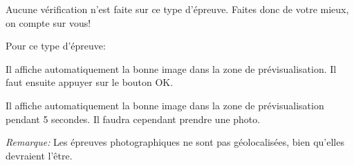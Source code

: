\documentclass[11pt]{scrreprt}
\begin{document}
    Aucune vérification n'est faite sur ce type d'épreuve. Faites donc de votre mieux, on compte sur vous!

    Pour ce type d'épreuve:
    \begin{description}[style=nextline]
        \item[Bouton de triche]Il affiche automatiquement la bonne image dans la zone de prévisualisation. Il faut ensuite appuyer sur le bouton OK.
        \item[Bouton d'aide]Il affiche automatiquement la bonne image dans la zone de prévisualisation pendant 5 secondes. Il faudra cependant prendre une photo.
    \end{description}

    \textit{Remarque: }Les épreuves photographiques ne sont pas géolocalisées, bien qu'elles devraient l'être.
\end{document}
